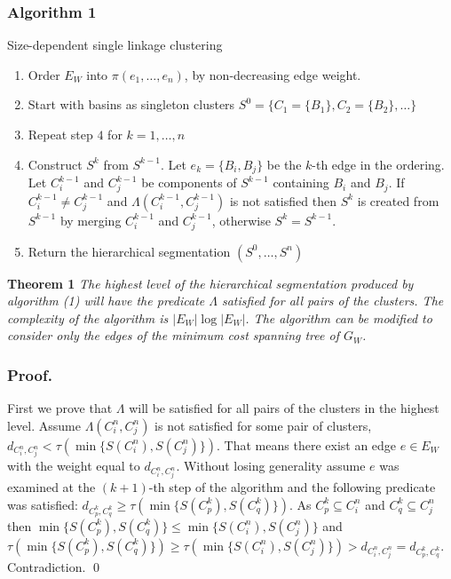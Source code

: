 \documentclass{llncs}
\begin{document}
\subsubsection{Algorithm 1 } Size-dependent single linkage clustering
\begin{enumerate}
\item Order $E_{W}$ into $\pi(e_{1},\dots,e_{n})$, by non-decreasing edge
weight.
\item Start with basins as singleton clusters $S^{0}=\{C_{1}=\{B_{1}\},C_{2}=\{B_{2}\},\dots\}$
\item Repeat step $4$ for $k=1,\dots,n$
\item Construct $S^{k}$ from $S^{k-1}$. Let $e_{k}=\{B_{i},B_{j}\}$ be
the $k$-th edge in the ordering. Let $C_{i}^{k-1}$ and $C_{j}^{k-1}$
be components of $S^{k-1}$ containing $B_{i}$ and $B_{j}$. If $C_{i}^{k-1}\neq C_{j}^{k-1}$
and $\Lambda(C_{i}^{k-1},C_{j}^{k-1})$ is not satisfied then $S^{k}$ is created from
$S^{k-1}$ by merging $C_{i}^{k-1}$ and $C_{j}^{k-1}$, otherwise
$S^{k}=S^{k-1}.$
\item Return the hierarchical segmentation $(S^{0},\dots,S^{n})$
\end{enumerate}
\textbf{Theorem 1 }\emph{The highest level of the hierarchical segmentation
produced by algorithm (1) will have the predicate $\Lambda$ satisfied
for all pairs of the clusters. The complexity of the algorithm is
$\left|E_{W}\right|\log\left|E_{W}\right|$. The algorithm can be
modified to consider only the edges of the minimum cost spanning tree
of $G_{W}$.}

\subsubsection{Proof.} First we prove that $\Lambda$ will be satisfied for all pairs of the clusters in the highest level. Assume $\Lambda(C^n_i,C^n_j)$ is not satisfied for some pair of clusters, $d_{C^n_i,C^n_j} < \tau(\min\{S(C^n_i),S(C^n_j)\})$. That means there exist an edge $e \in E_W$ with the weight equal to $d_{C^n_i,C^n_j}$. Without losing generality assume $e$ was examined at the $(k+1)$-th step of the algorithm and the following predicate was satisfied: $d_{C^k_p,C^k_q} \ge \tau(\min\{S(C^k_p),S(C^k_q)\})$. As $C^k_p \subseteq C^n_i$ and $C^k_q \subseteq C^n_j$ then $\min\{S(C^k_p),S(C^k_q)\} \le \min\{S(C^n_i),S(C^n_j)\}$ and $\tau(\min\{S(C^k_p),S(C^k_q)\}) \ge \tau(\min\{S(C^n_i),S(C^n_j)\}) > d_{C^n_i,C^n_j} = d_{C^k_p,C^k_q}$. Contradiction. \qed
\end{document}
